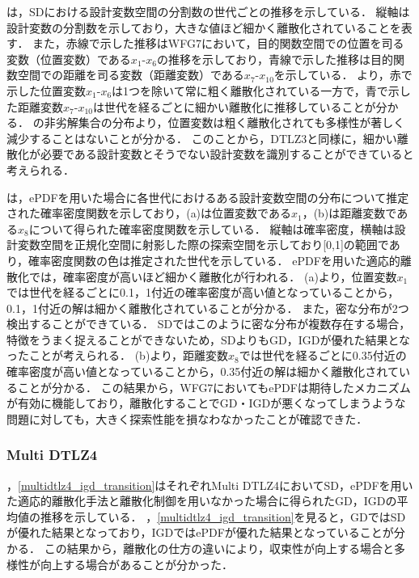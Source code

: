 \documentclass[../main/main]{subfiles}
\begin{document}
は，SDにおける設計変数空間の分割数の世代ごとの推移を示している．
縦軸は設計変数の分割数を示しており，大きな値ほど細かく離散化されていることを表す．
また，赤線で示した推移はWFG7において，目的関数空間での位置を司る変数（位置変数）である$x_1$-$x_6$の推移を示しており，青線で示した推移は目的関数空間での距離を司る変数（距離変数）である$x_7$-$x_{10}$を示している．
より，赤で示した位置変数$x_1$-$x_6$は1つを除いて常に粗く離散化されている一方で，青で示した距離変数$x_7$-$x_{10}$は世代を経るごとに細かい離散化に推移していることが分かる．
の非劣解集合の分布より，位置変数は粗く離散化されても多様性が著しく減少することはないことが分かる．
このことから，DTLZ3と同様に，細かい離散化が必要である設計変数とそうでない設計変数を識別することができていると考えられる．

は，ePDFを用いた場合に各世代におけるある設計変数空間の分布について推定された確率密度関数を示しており，(a)は位置変数である$x_1$，(b)は距離変数である$x_{8}$について得られた確率密度関数を示している．
縦軸は確率密度，横軸は設計変数空間を正規化空間に射影した際の探索空間を示しており[0,1]の範囲であり，確率密度関数の色は推定された世代を示している．
ePDFを用いた適応的離散化では，確率密度が高いほど細かく離散化が行われる．
(a)より，位置変数$x_1$では世代を経るごとに0.1，1付近の確率密度が高い値となっていることから，0.1，1付近の解は細かく離散化されていることが分かる．
また，密な分布が2つ検出することができている．
SDではこのように密な分布が複数存在する場合，特徴をうまく捉えることができないため，SDよりもGD，IGDが優れた結果となったことが考えられる．
(b)より，距離変数$x_8$では世代を経るごとに0.35付近の確率密度が高い値となっていることから，0.35付近の解は細かく離散化されていることが分かる．
この結果から，WFG7においてもePDFは期待したメカニズムが有効に機能しており，離散化することでGD・IGDが悪くなってしまうような問題に対しても，大きく探索性能を損なわなかったことが確認できた．


\clearpage

\subsubsection{Multi DTLZ4}

，\ref{multidtlz4_igd_transition}はそれぞれMulti DTLZ4においてSD，ePDFを用いた適応的離散化手法と離散化制御を用いなかった場合に得られたGD，IGDの平均値の推移を示している．
，\ref{multidtlz4_igd_transition}を見ると，GDではSDが優れた結果となっており，IGDではePDFが優れた結果となっていることが分かる．
この結果から，離散化の仕方の違いにより，収束性が向上する場合と多様性が向上する場合があることが分かった．
\end{document}
